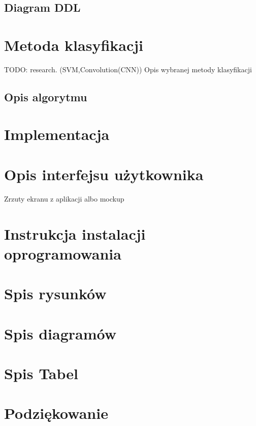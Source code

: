 \documentclass[wmii,inf,mgr]{uwmthesis}
\begin{document}
\section{Diagram DDL}

\chapter{Metoda klasyfikacji}

TODO: research. (SVM,Convolution(CNN)) 
Opis wybranej metody klasyfikacji

\section{Opis algorytmu}

\chapter{Implementacja}
\chapter{Opis interfejsu użytkownika}
Zrzuty ekranu z aplikacji albo mockup
\chapter*{Instrukcja instalacji oprogramowania}

\chapter*{Spis rysunków}
\chapter*{Spis diagramów}
\chapter*{Spis Tabel}

\chapter*{Podziękowanie}

\begin{streszczenie}

\end{streszczenie}

\begin{abstract}

\end{abstract}
\end{document}
